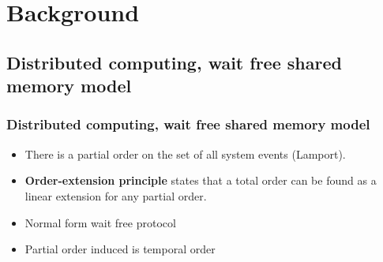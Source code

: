 \documentclass[hyperref={pdfpagelabels=false}]{beamer}
\begin{document}
\section{Background} 
\subsection{Distributed computing, wait free shared memory model} 
\begin{frame}
\frametitle{Distributed computing, wait free shared memory model}
  \begin{itemize}[<+->]
  \item There is a partial order on the set of all system events (Lamport).
  \item {\bf Order-extension principle} states that a total order can be found as a linear extension for any partial order.
  \item Normal form wait free protocol
  \item Partial order induced is temporal order
  \end{itemize}


\end{frame}
\end{document}
